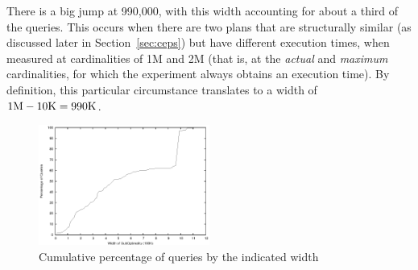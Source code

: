 There is a big jump at 990,000, with this width accounting for about a third
of the queries. This occurs when there are two plans that are structurally
similar (as discussed later in Section~\ref{sec:ceps}) but have different
execution times, when measured at cardinalities of 1M and
2M (that is, at the {\em actual} and {\em maximum} cardinalities, for which
the experiment always obtains an execution time). By definition, this
particular circumstance translates to a width of $1\hbox{M} - 10\hbox{K} =
990\hbox{K}$.

\begin{figure}[bth]\centering
\includegraphics[width=0.50\textwidth]{figures/width_cumulative.eps}
\caption{Cumulative percentage of queries by
  the indicated width\label{fig:width}}
\end{figure}


